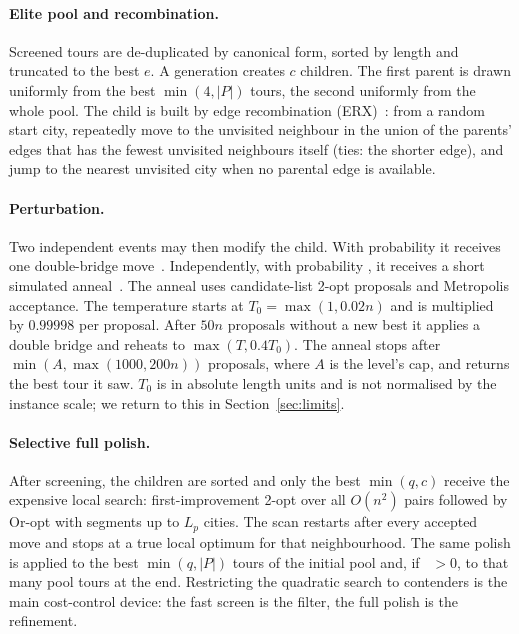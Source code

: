 \paragraph{Elite pool and recombination.}
Screened tours are de-duplicated by canonical form, sorted by length and truncated to the best $e$.
A generation creates $c$ children. The first parent is drawn uniformly from the best $\min(4,|P|)$
tours, the second uniformly from the whole pool. The child is built by edge recombination
(ERX)~\citep{whitley1989}: from a random start city, repeatedly move to the unvisited neighbour in the
union of the parents' edges that has the fewest unvisited neighbours itself (ties: the shorter
edge), and jump to the nearest unvisited city when no parental edge is available.

\paragraph{Perturbation.}
Two independent events may then modify the child. With probability  it receives one
double-bridge move~\citep{martin1991}. Independently, with probability , it receives a
short simulated anneal~\citep{kirkpatrick1983}. The anneal uses candidate-list 2-opt proposals and
Metropolis acceptance. The temperature starts at $T_0=\max(1,0.02n)$ and is multiplied by $0.99998$
per proposal. After $50n$ proposals without a new best it applies a double bridge and reheats to
$\max(T,0.4T_0)$. The anneal stops after $\min(A,\max(1000,200n))$ proposals, where $A$ is the level's
cap, and returns the best tour it saw. $T_0$ is in absolute length units and is not normalised by the
instance scale; we return to this in Section~\ref{sec:limits}.

\paragraph{Selective full polish.}
After screening, the children are sorted and only the best $\min(q,c)$ receive the expensive local search:
first-improvement 2-opt over all $O(n^2)$ pairs followed by Or-opt with segments up to $L_p$ cities.
The scan restarts after every accepted move and stops at a true local optimum for that
neighbourhood. The same polish is applied to the best $\min(q,|P|)$ tours of the initial pool and, if
~$>0$, to that many pool tours at the end. Restricting the quadratic search to
contenders is the main cost-control device: the fast screen is the filter, the full polish is the
refinement.

